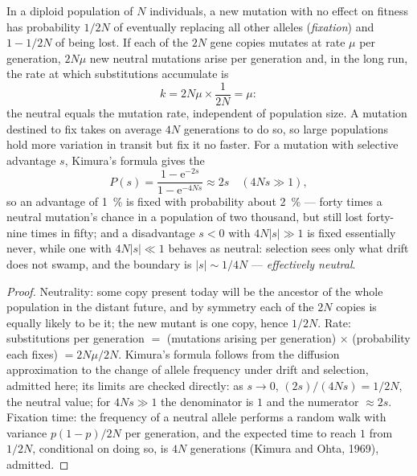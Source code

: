 \begin{theorem}\label{thm:b3:molecular-evolution:neutral}
In a diploid population of $N$ individuals, a new mutation with no
effect on fitness has probability $1/2N$ of eventually replacing all
other alleles (\emph{fixation}) and $1 - 1/2N$ of being lost. If each
of the $2N$ gene copies mutates at rate $\mu$ per generation, $2N\mu$
new neutral mutations arise per generation and, in the long run, the
rate at which substitutions accumulate is
\[
k = 2N\mu\times\frac{1}{2N} = \mu :
\]
the neutral \emph{} equals the mutation rate,
independent of population size. A mutation destined to fix takes on
average $4N$ generations to do so, so large populations hold more
variation in transit but fix it no faster. For a mutation with
selective advantage $s$, Kimura's formula gives the 
\[
P(s) = \frac{1 - \mathrm{e}^{-2s}}{1 - \mathrm{e}^{-4Ns}} \approx 2s
\quad (4Ns \gg 1),
\]
so an advantage of \qty{1}{\%} is fixed with probability about
\qty{2}{\%} --- forty times a neutral mutation's chance in a
population of two thousand, but still lost forty-nine times in fifty;
and a disadvantage $s < 0$ with $4N|s| \gg 1$ is fixed essentially
never, while one with $4N|s| \ll 1$ behaves as neutral: selection
sees only what drift does not swamp, and the boundary is $|s| \sim
1/4N$ --- \emph{effectively neutral}.
\end{theorem}
\begin{proof}
Neutrality: some copy present today will be the ancestor of the whole
population in the distant future, and by symmetry each of the $2N$
copies is equally likely to be it; the new mutant is one copy, hence
$1/2N$. Rate: substitutions per generation $=$ (mutations arising per
generation) $\times$ (probability each fixes) $= 2N\mu/2N$. Kimura's
formula follows from the diffusion approximation to the change of
allele frequency under drift and selection, admitted here; its limits
are checked directly: as $s \to 0$, $(2s)/(4Ns) = 1/2N$, the neutral
value; for $4Ns \gg 1$ the denominator is $1$ and the numerator
$\approx 2s$. Fixation time: the frequency of a neutral allele
performs a random walk with variance $p(1-p)/2N$ per generation, and
the expected time to reach $1$ from $1/2N$, conditional on doing so,
is $4N$ generations (Kimura and Ohta, 1969), admitted.
\end{proof}

